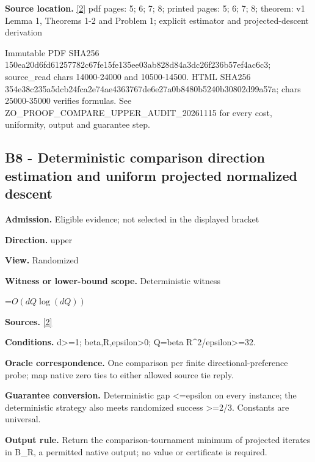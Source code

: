 \documentclass[10pt,a4paper]{article}
\newcommand{\AtlasMath}[1]{\par\begingroup\centering\setbox0=\hbox{$\displaystyle #1$}\ifdim\wd0>1.4\linewidth\typeout{ATLAS WIDE FORMULA: \the\wd0}\fi\ifdim\wd0>\linewidth\resizebox{\linewidth}{!}{\box0}\else\box0\fi\par\endgroup}
\begin{document}
\textbf{Source location.} \href{https://arxiv.org/html/2405.11454v1}{[2]} pdf pages: 5; 6; 7; 8; printed pages: 5; 6; 7; 8; theorem: v1 Lemma 1, Theorems 1-2 and Problem 1; explicit estimator and projected-descent derivation



Immutable PDF SHA256 150ea20d6fd61257782c67fe\allowbreak{}15fe135ee03ab828d84a3dc2\allowbreak{}6f236b57ef4ac6c3; source\_read chars 14000-24000 and 10500-14500. HTML SHA256 354e38c235a5dcb24fca2e74\allowbreak{}ae4363767de6e27a0b8480b5\allowbreak{}240b30802d99a57a; chars 25000-35000 verifies formulas. See ZO\_PROOF\_COMPARE\_UPPER\_AUDIT\_20261115 for every cost, uniformity, output and guarantee step.



\subsection{B8 - Deterministic comparison direction estimation and uniform projected normalized descent}


\textbf{Admission.} Eligible evidence; not selected in the displayed bracket



\textbf{Direction.} upper



\textbf{View.} Randomized



\textbf{Witness or lower-bound scope.} Deterministic witness



\AtlasMath{O(dQ\log(dQ))}


\textbf{Sources.} \href{https://arxiv.org/html/2405.11454v1}{[2]}



\textbf{Conditions.} d>=1; beta,R,epsilon>0; Q=beta R\textasciicircum{}2/epsilon>=32.



\textbf{Oracle correspondence.} One comparison per finite directional-preference probe; map native zero ties to either allowed source tie reply.



\textbf{Guarantee conversion.} Deterministic gap <=epsilon on every instance; the deterministic strategy also meets randomized success >=2/3. Constants are universal.



\textbf{Output rule.} Return the comparison-tournament minimum of projected iterates in B\_R, a permitted native output; no value or certificate is required.
\end{document}
